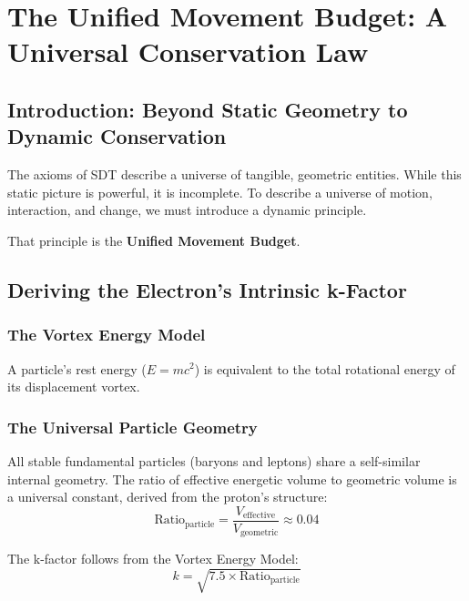 \chapter{The Unified Movement Budget: A Universal Conservation Law}


\section{Introduction: Beyond Static Geometry to Dynamic Conservation}

The axioms of SDT describe a universe of tangible, geometric entities.  While this static picture is powerful, it is incomplete.  To describe a universe of motion, interaction, and change, we must introduce a dynamic principle.

That principle is the \textbf{Unified Movement Budget}.


\section{Deriving the Electron's Intrinsic k-Factor}

\subsection{The Vortex Energy Model}

A particle's rest energy ($E = mc^2$) is equivalent to the total rotational energy of its displacement vortex.

\subsection{The Universal Particle Geometry}

All stable fundamental particles (baryons and leptons) share a self-similar internal geometry.  The ratio of effective energetic volume to geometric volume is a universal constant, derived from the proton's structure:
\begin{equation}\label{eq:ratio}
  \text{Ratio}_{\text{particle}} = \frac{V_{\text{effective}}}{V_{\text{geometric}}} \approx 0.04
\end{equation}

The k-factor follows from the Vortex Energy Model:
\begin{equation}\label{eq:k-derive}
  k = \sqrt{7.5 \times \text{Ratio}_{\text{particle}}}
\end{equation}

